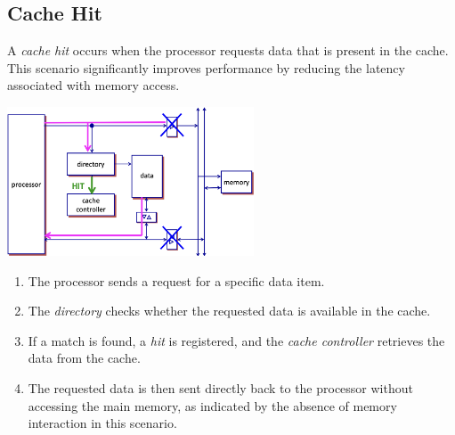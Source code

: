 \subsection{Cache Hit}
A \textit{cache hit} occurs when the processor requests data that is present in the cache. This scenario significantly improves performance by reducing the latency associated with memory access.
\begin{center}
    \includegraphics[width=0.55\textwidth]{chapters/chapter3a/images/hit.png}
\end{center}
\begin{enumerate}
    \item The processor sends a request for a specific data item.
    \item The \textit{directory} checks whether the requested data is available in the cache.
    \item If a match is found, a \textit{hit} is registered, and the \textit{cache controller} retrieves the data from the cache.
    \item The requested data is then sent directly back to the processor without accessing the main memory, as indicated by the absence of memory interaction in this scenario.
\end{enumerate}

